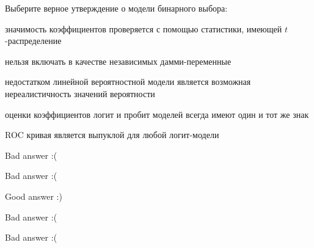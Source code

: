 
\begin{question}
Выберите верное утверждение о модели бинарного выбора:
\begin{answerlist}
  \item значимость коэффициентов проверяется с помощью статистики, имеющей \(t\)-распределение
  \item нельзя включать в качестве независимых дамми-переменные
  \item недостатком линейной вероятностной модели является возможная нереалистичность значений вероятности
  \item оценки коэффициентов логит и пробит моделей всегда имеют один и тот же знак
  \item ROC кривая является выпуклой для любой логит-модели
\end{answerlist}
\end{question}

\begin{solution}
\begin{answerlist}
  \item Bad answer :(
  \item Bad answer :(
  \item Good answer :)
  \item Bad answer :(
  \item Bad answer :(
\end{answerlist}
\end{solution}

